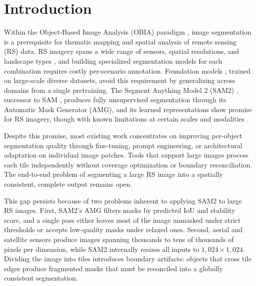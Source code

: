 \documentclass[review,11pt,authoryear]{elsarticle}
\begin{document}
\linenumbers

\section{Introduction}
\label{sec:introduction}

Within the Object-Based Image Analysis (OBIA) paradigm \citep{blaschke2010obia, hay2008geobia, blaschke2014geobia}, image segmentation is a prerequisite for thematic mapping and spatial analysis of remote sensing (RS) data. RS imagery spans a wide range of sensors, spatial resolutions, and landscape types \citep{zhu2017deep_rs, li2024dl_seg_review}, and building specialized segmentation models for each combination requires costly per-scenario annotation. Foundation models \citep{bommasani2021foundation, xiao2025foundation_rs}, trained on large-scale diverse datasets, avoid this requirement by generalizing across domains from a single pretraining. The Segment Anything Model 2 (SAM2) \citep{ravi2024sam2}, successor to SAM \citep{kirillov2023segment}, produces fully unsupervised segmentation through its Automatic Mask Generator (AMG), and its learned representations show promise for RS imagery, though with known limitations at certain scales and modalities \citep{chen2024rsprompter, wang2024samrs, ren2024segment_anything_everywhere, osco2023sam_rs_review}.

Despite this promise, most existing work concentrates on improving per-object segmentation quality through fine-tuning, prompt engineering, or architectural adaptation on individual image patches. Tools that support large images process each tile independently without coverage optimization or boundary reconciliation. The end-to-end problem of segmenting a large RS image into a spatially consistent, complete output remains open.

This gap persists because of two problems inherent to applying SAM2 to large RS images. First, SAM2's AMG filters masks by predicted IoU and stability score, and a single pass either leaves most of the image unmasked under strict thresholds or accepts low-quality masks under relaxed ones. Second, aerial and satellite sensors produce images spanning thousands to tens of thousands of pixels per dimension, while SAM2 internally resizes all inputs to $1{,}024 \times 1{,}024$. Dividing the image into tiles introduces boundary artifacts: objects that cross tile edges produce fragmented masks that must be reconciled into a globally consistent segmentation.
\end{document}
